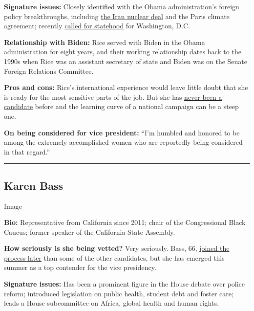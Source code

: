 \textbf{Signature issues:} Closely identified with the Obama
administration's foreign policy breakthroughs, including
\href{https://www.nytimes.com/2018/05/08/opinion/trump-iran-deal-foolish.html}{the
Iran nuclear deal} and the Paris climate agreement; recently
\href{https://www.nytimes.com/2020/06/09/opinion/trump-military-washington-statehood.html}{called
for statehood} for Washington, D.C.

\textbf{Relationship with Biden:} Rice served with Biden in the Obama
administration for eight years, and their working relationship dates
back to the 1990s when Rice was an assistant secretary of state and
Biden was on the Senate Foreign Relations Committee.

\textbf{Pros and cons:} Rice's international experience would leave
little doubt that she is ready for the most sensitive parts of the job.
But she has
\href{https://www.nytimes.com/2020/07/27/us/politics/susan-rice-biden-vice-president.html}{never
been a candidate} before and the learning curve of a national campaign
can be a steep one.

\textbf{On being considered for vice president:} ``I'm humbled and
honored to be among the extremely accomplished women who are reportedly
being considered in that regard.''

\begin{center}\rule{0.5\linewidth}{\linethickness}\end{center}

\hypertarget{karen-bass}{%
\subsection{Karen Bass}\label{karen-bass}}

Image

\textbf{Bio:} Representative from California since 2011; chair of the
Congressional Black Caucus; former speaker of the California State
Assembly.

\textbf{How seriously is she being vetted?} Very seriously. Bass, 66,
\href{https://www.nytimes.com/2020/06/23/us/politics/karen-bass-joe-biden-vp.html}{joined
the process later} than some of the other candidates, but she has
emerged this summer as a top contender for the vice presidency.

\textbf{Signature issues:} Has been a prominent figure in the House
debate over police reform; introduced legislation on public health,
student debt and foster care; leads a House subcommittee on Africa,
global health and human rights.

